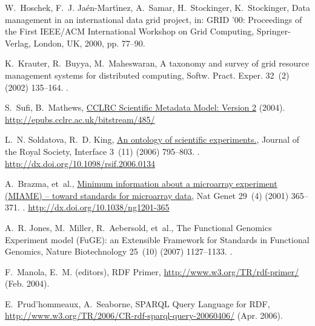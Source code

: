 \documentclass{elsarticle}
\begin{document}
\begin{thebibliography}{10}
W.~Hoschek, F.~J. Ja\'{e}n-Mart\'{\i}nez, A.~Samar, H.~Stockinger,
  K.~Stockinger, Data management in an international data grid project, in:
  GRID '00: Proceedings of the First IEEE/ACM International Workshop on Grid
  Computing, Springer-Verlag, London, UK, 2000, pp. 77--90.

K.~Krauter, R.~Buyya, M.~Maheswaran, A taxonomy and survey of grid
resource
  management systems for distributed computing, Softw. Pract. Exper. 32~(2)
  (2002) 135--164.
\newblock \href {http://dx.doi.org/http://dx.doi.org/10.1002/spe.432}
  {}.

S.~Sufi, B.~Mathews,
\href{http://epubs.cclrc.ac.uk/bitstream/485/}{{CCLRC
  Scientific Metadata Model: Version 2}} (2004).
\newline\urlprefix\url{http://epubs.cclrc.ac.uk/bitstream/485/}

L.~N. Soldatova, R.~D. King,
\href{http://dx.doi.org/10.1098/rsif.2006.0134}{An
  ontology of scientific experiments.}, Journal of the Royal Society, Interface
  3~(11) (2006) 795--803.
\newblock \href {http://dx.doi.org/10.1098/rsif.2006.0134}
  {}.
\newline\urlprefix\url{http://dx.doi.org/10.1098/rsif.2006.0134}

A.~Brazma, et~al.,
\href{http://dx.doi.org/10.1038/ng1201-365}{{Minimum
  information about a microarray experiment (MIAME) -- toward standards for
  microarray data}}, Nat Genet 29~(4) (2001) 365--371.
\newblock \href {http://dx.doi.org/10.1038/ng1201-365}
  {}.
\newline\urlprefix\url{http://dx.doi.org/10.1038/ng1201-365}

A.~R. Jones, M.~Miller, R.~Aebersold, et~al., {The Functional
Genomics
  Experiment model (FuGE): an Extensible Framework for Standards in Functional
  Genomics}, Nature Biotechnology 25~(10) (2007) 1127--1133.
\newblock \href {http://dx.doi.org/10.1038/nbt1347}
  {}.

F.~Manola, E.~M. (editors), {{RDF Primer}},
  \url{http://www.w3.org/TR/rdf-primer/} (Feb. 2004).

E.~Prud'hommeaux, A.~Seaborne, {SPARQL Query Language for RDF},
  \url{http://www.w3.org/TR/2006/CR-rdf-sparql-query-20060406/} (Apr. 2006).


\end{thebibliography}
\end{document}
